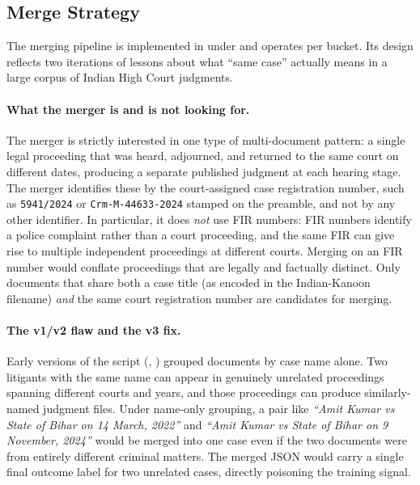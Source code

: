 \subsection{Merge Strategy}
\label{sec:merge_strategy}

The merging pipeline is implemented in  under
 and operates per bucket.
Its design reflects two iterations of lessons about what ``same case'' actually
means in a large corpus of Indian High Court judgments.

\paragraph{What the merger is and is not looking for.}
The merger is strictly interested in one type of multi-document pattern: a single
legal proceeding that was heard, adjourned, and returned to the same court on
different dates, producing a separate published judgment at each hearing stage.
The merger identifies these by the court-assigned case registration number, such
as \texttt{5941/2024} or \texttt{Crm-M-44633-2024} stamped on the preamble, and
not by any other identifier. In particular, it does \emph{not} use FIR numbers:
FIR numbers identify a police complaint rather than a court proceeding, and the
same FIR can give rise to multiple independent proceedings at different courts.
Merging on an FIR number would conflate proceedings that are legally and
factually distinct. Only documents that share both a case title (as encoded in
the Indian-Kanoon filename) \emph{and} the same court registration number are
candidates for merging.

\paragraph{The v1/v2 flaw and the v3 fix.}
Early versions of the script (, )
grouped documents by case name alone. Two litigants with the same name can appear
in genuinely unrelated proceedings spanning different courts and years, and those
proceedings can produce similarly-named judgment files. Under name-only grouping,
a pair like \emph{``Amit Kumar vs State of Bihar on 14 March, 2022''} and
\emph{``Amit Kumar vs State of Bihar on 9 November, 2024''} would be merged into
one case even if the two documents were from entirely different criminal matters.
The merged JSON would carry a single final outcome label for two unrelated cases,
directly poisoning the training signal.

